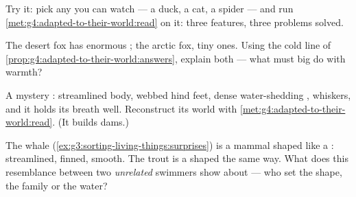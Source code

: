 \begin{exercise}[$\star$]\label{exo:g4:adapted-to-their-world:8}
Try it: pick any  you can watch --- a duck, a cat, a
spider --- and run
\cref{met:g4:adapted-to-their-world:read} on it: three
features, three problems solved.
\end{exercise}

\begin{exercise}[$\star\star$]\label{exo:g4:adapted-to-their-world:9}
The desert fox has enormous ; the arctic fox, tiny ones.
Using the cold line of
\cref{prop:g4:adapted-to-their-world:answers}, explain both
--- what must big  do with warmth?
\end{exercise}

\begin{exercise}[$\star\star$]\label{exo:g4:adapted-to-their-world:10}
A mystery : streamlined body, webbed hind feet, dense
water-shedding , whiskers, and it holds its breath well.
Reconstruct its world with
\cref{met:g4:adapted-to-their-world:read}. (It builds dams.)
\end{exercise}

\begin{exercise}[$\star\star\star$]\label{exo:g4:adapted-to-their-world:11}
The whale (\cref{ex:g3:sorting-living-things:surprises}) is a
mammal shaped like a : streamlined, finned, smooth. The
trout is a  shaped the same way. What does this
resemblance between two \emph{unrelated} swimmers show about
 --- who set the shape, the family or the water?
\end{exercise}

